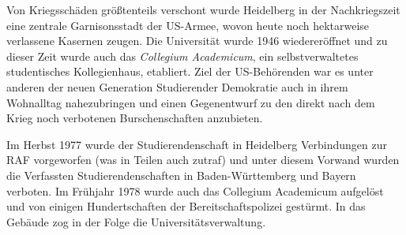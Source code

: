 Von Kriegsschäden größtenteils verschont wurde Heidelberg in der Nachkriegszeit eine zentrale Garnisonsstadt der US-Armee, wovon heute noch hektarweise verlassene Kasernen zeugen. Die Universität wurde 1946 wiedereröffnet und zu dieser Zeit wurde auch das \textit{Collegium Academicum}, ein selbstverwaltetes studentisches Kollegienhaus, etabliert. Ziel der US-Behörenden war es unter anderen der neuen Generation Studierender Demokratie auch in ihrem Wohnalltag nahezubringen und einen Gegenentwurf zu den direkt nach dem Krieg noch verbotenen Burschenschaften anzubieten.

Im Herbst 1977 wurde der Studierendenschaft in Heidelberg Verbindungen zur RAF vorgeworfen (was in Teilen auch zutraf) und unter diesem Vorwand wurden die Verfassten Studierendenschaften in Baden-Württemberg und Bayern verboten. Im Frühjahr 1978 wurde auch das Collegium Academicum aufgelöst und von einigen Hundertschaften der Bereitschaftspolizei gestürmt. In das Gebäude zog in der Folge die Universitätsverwaltung.
